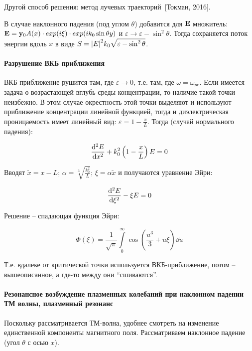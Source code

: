 \documentclass[10pt, a4paper]{article}
\newcommand{\Tokman}{~[Токман, 2016]}
\begin{document}
Другой способ решения: метод лучевых траекторий\Tokman.

В случае наклонного падения (под углом $\theta$) добавится для $\vb{E}$ множитель: $\vb{E} = \vb{y}_0A(x)\cdot exp(i\xi)\cdot exp(ik_0\sin\theta y)$ и $\varepsilon\rightarrow\varepsilon - \sin^2\theta$. Тогда сохраняется поток энергии вдоль $x$ в виде $S = \abs{E}^2k_0\sqrt{\varepsilon-\sin^2\theta}$.

\paragraph{Разрушение ВКБ приближения}

ВКБ приближение рушится там, где $\varepsilon\rightarrow 0$, т.е. там, где $\omega=\omega_{pe}$. Если имеется задача о возрастающей вглубь среды концентрации, то наличие такой точки неизбежно. В этом случае окрестность этой точки выделяют и используют приближение концентрации линейной функцией, тогда и диэлектрическая проницаемость имеет линейный вид: $\varepsilon = 1-\frac{x}{L}$. Тогда (случай нормального падения):

\begin{equation*}
	\dv[2]{E}{x}+k_0^2\left(1-\frac{x}{L}\right)E = 0
\end{equation*}

Вводят $\tilde{x} = x-L$; $\alpha = \sqrt[3]{\frac{k_0^2}{L}}$; $\xi = \alpha\tilde{x}$ и получаются уравнение Эйри:

\begin{equation*}
	\dv[2]{E}{\xi}-\xi E = 0
\end{equation*}

Решение -- спадающая функция Эйри:

\begin{equation*}
	\varPhi(\xi) = \frac{1}{\sqrt{\pi}}\int\limits_0^\infty\cos\left(\frac{u^3}{3}+u\xi\right)\dd{u} 
\end{equation*}

Т.е. вдалеке от критической точки используется ВКБ-приближение, потом -- вышеописанное, а где-то между они ``сшиваются''. 

\paragraph{Резонансное возбуждение плазменных колебаний при наклонном падении ТМ волны, плазменный резонанс}

Поскольку рассматривается ТМ-волна, удобнее смотреть на изменение единственной компоненты магнитного поля. Рассматриваем наклонное падение (угол $\theta$ с осью $x$).
\end{document}
